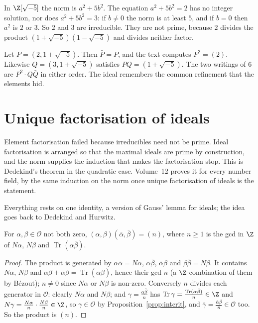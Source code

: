 
\begin{examplex}
In $\Z[\sqrt{-5}]$ the norm is $a^2+5b^2$. The equation $a^2+5b^2=2$ has no integer solution, nor does $a^2+5b^2=3$: if $b\ne 0$ the norm is at least $5$, and if $b=0$ then $a^2$ is $2$ or $3$. So $2$ and $3$ are irreducible. They are not prime, because $2$ divides the product $(1+\sqrt{-5})(1-\sqrt{-5})$ and divides neither factor.
\end{examplex}

\begin{examplex}
Let $P=(2,1+\sqrt{-5})$. Then $\bar P=P$, and the text computes $P^2=(2)$. Likewise $Q=(3,1+\sqrt{-5})$ satisfies $PQ=(1+\sqrt{-5})$. The two writings of $6$ are $P^2\cdot Q\bar Q$ in either order. The ideal remembers the common refinement that the elements hid.
\end{examplex}

\section{Unique factorisation of ideals}

Element factorisation failed because irreducibles need not be prime. Ideal factorisation is arranged so that the maximal ideals are prime by construction, and the norm supplies the induction that makes the factorisation stop. This is Dedekind's theorem in the quadratic case. Volume~12 proves it for every number field, by the same induction on the norm once unique factorisation of ideals is the statement.

Everything rests on one identity, a version of Gauss' lemma for ideals; the idea goes back to Dedekind and Hurwitz.

\begin{lemma}\label{lem:hurwitz}
For $\alpha,\beta\in\mathcal O$ not both zero, $(\alpha,\beta)(\bar\alpha,\bar\beta)=(n)$, where $n\ge1$ is the gcd in $\Z$ of $N\alpha$, $N\beta$ and $\operatorname{Tr}(\alpha\bar\beta)$.
\end{lemma}
\begin{proof}
The product is generated by $\alpha\bar\alpha=N\alpha$, $\alpha\bar\beta$, $\bar\alpha\beta$ and $\beta\bar\beta=N\beta$. It contains $N\alpha$, $N\beta$ and $\alpha\bar\beta+\bar\alpha\beta=\operatorname{Tr}(\alpha\bar\beta)$, hence their gcd $n$ (a $\Z$-combination of them by B\'ezout); $n\ne0$ since $N\alpha$ or $N\beta$ is non-zero. Conversely $n$ divides each generator in $\mathcal O$: clearly $N\alpha$ and $N\beta$; and $\gamma=\frac{\alpha\bar\beta}n$ has $\operatorname{Tr}\gamma=\frac{\operatorname{Tr}(\alpha\bar\beta)}n\in\Z$ and $N\gamma=\frac{N\alpha}n\cdot\frac{N\beta}n\in\Z$, so $\gamma\in\mathcal O$ by Proposition~\ref{prop:intcrit}, and $\bar\gamma=\frac{\bar\alpha\beta}n\in\mathcal O$ too. So the product is $(n)$.
\end{proof}

